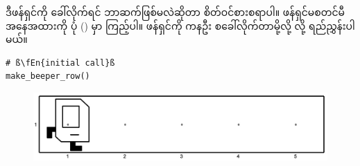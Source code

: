 ဒီဖန်ရှင်ကို ခေါ်လိုက်ရင် ဘာဆက်ဖြစ်မလဲဆိုတာ စိတ်ဝင်စားစရာပါ။  ဖန်ရှင်မစတင်မီ အနေအထားကို ပုံ  (\fRefNo{\ref{fig:mrofb_recur1}}) မှာ ကြည့်ပါ။ ဖန်ရှင်ကို ကနဦး  စခေါ်လိုက်တာမို့လို့  လို့ ရည်ညွှန်းပါမယ်။
%
\setlength{\fboxsep}{0pt}
\begin{verbatim}
# ß\fEn{initial call}ß
make_beeper_row()
\end{verbatim}
%
\begin{figure}[htb!]
    {\includegraphics[scale=0.15]{images/ch04/mrofb/before.jpg}}
\caption{}
\label{fig:mrofb_recur1}
\end{figure}

